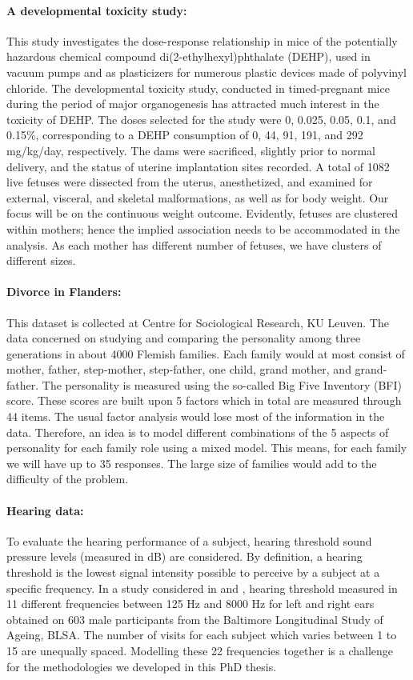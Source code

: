 \documentclass[14pt]{article}
\begin{document}
\paragraph*{A developmental toxicity study:} This study investigates the dose-response
relationship in mice of the potentially hazardous chemical compound di(2-ethylhexyl)phthalate
(DEHP), used in vacuum pumps and as plasticizers for numerous plastic devices made of polyvinyl chloride. The developmental toxicity study, conducted in timed-pregnant
mice during the period of major organogenesis has attracted
much interest in the toxicity of DEHP. The doses selected for the study were 0, 0.025, 0.05, 0.1,
and 0.15\%, corresponding to a DEHP consumption of 0, 44, 91, 191, and 292 mg/kg/day, respectively.
The dams were sacrificed, slightly prior to normal delivery, and the status of uterine implantation sites recorded. A total of 1082 live fetuses were dissected from the uterus, anesthetized, and examined for external, visceral, and skeletal malformations, as well as for body
weight. Our focus will be on the continuous weight outcome. Evidently, fetuses are clustered within mothers; hence the implied association needs to be accommodated in the analysis. As each mother has different number of fetuses, we have clusters of different sizes. 


\paragraph*{Divorce in Flanders:} This dataset is collected at Centre for Sociological Research, KU Leuven. The data concerned on studying and comparing the personality among
three generations in about 4000 Flemish families. Each family would at most consist of mother, father, step-mother, step-father, one child, grand mother, and grand-father. The personality is measured using the so-called
Big Five Inventory (BFI) score. These scores are built upon 5 factors which in total are measured through 44 items. The usual factor analysis would lose most of the information in the data. Therefore, an idea is to model different combinations of the 5 aspects of personality for each family role using a mixed model. This means, for each family we will have up to 35 responses. The large size of families would add to the difficulty of the problem.

\paragraph*{Hearing data:} To evaluate the hearing performance of a subject, hearing threshold sound pressure levels (measured in dB) are considered. By definition, a hearing threshold is the lowest signal intensity possible to perceive by a subject at a specific frequency. In a study considered in \cite{verbeke2009} and \cite{Verbeke2006}, hearing threshold measured in 11 different frequencies between 125 Hz and 8000 Hz for left and right ears obtained on 603 male participants from the Baltimore Longitudinal Study of Ageing, BLSA. The number of visits for each subject which varies between 1 to 15 are unequally spaced. Modelling these 22 frequencies together is a challenge for the methodologies we developed in this PhD thesis.
\end{document}
